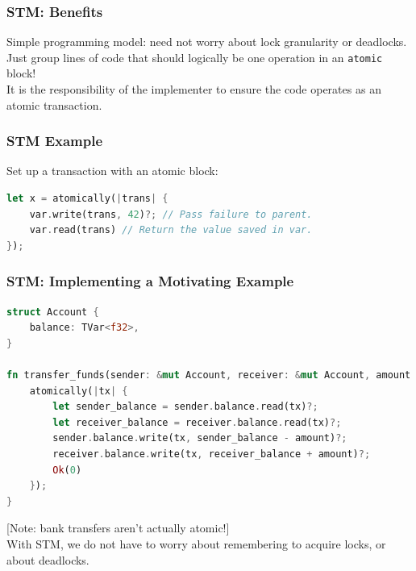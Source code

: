 \begin{frame}
  \frametitle{STM: Benefits}


    Simple programming model: need not worry about lock
      granularity or deadlocks.\\[1em]

    Just group lines of code that should logically be one operation
      in an {\tt atomic} block!\\[1em]

    It is the responsibility of the implementer to ensure the code
      operates as an atomic transaction.

\end{frame}


\begin{frame}[fragile]
\frametitle{STM Example}

Set up a transaction with an atomic block:

\begin{lstlisting}[language=Rust]
let x = atomically(|trans| {
    var.write(trans, 42)?; // Pass failure to parent.
    var.read(trans) // Return the value saved in var.
});
\end{lstlisting}


\end{frame}


\begin{frame}[fragile]
  \frametitle{STM: Implementing a Motivating Example}


\begin{lstlisting}[language=Rust]
struct Account {
    balance: TVar<f32>,
}

fn transfer_funds(sender: &mut Account, receiver: &mut Account, amount: f32) {
    atomically(|tx| {
        let sender_balance = sender.balance.read(tx)?;
        let receiver_balance = receiver.balance.read(tx)?;
        sender.balance.write(tx, sender_balance - amount)?;
        receiver.balance.write(tx, receiver_balance + amount)?;
        Ok(0)
    });
}
\end{lstlisting}

[Note: bank transfers aren't actually atomic!]\\[1em]

With STM, we do not have to worry about remembering to acquire locks,
      or about deadlocks.

\end{frame}

